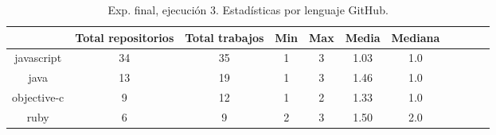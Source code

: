 \begin{table}
  \centering
  \caption{Exp. final, ejecución 3. Estadísticas por lenguaje GitHub.}
  \label{tab:tabla_f3_4}

\begin{footnotesize}
\renewcommand{\arraystretch}{1.5} %
\begin{tabular}{ccccccccccc}
  \hline
  {} &  Total repositorios &  Total trabajos &  Min &  Max &  Media &  Mediana \\
  \hline
  javascript   &         34 &          35 &    1 &    3 &   1.03 &      1.0 \\
  java         &         13 &          19 &    1 &    3 &   1.46 &      1.0 \\
  objective-c  &          9 &          12 &    1 &    2 &   1.33 &      1.0 \\
  ruby         &          6 &           9 &    2 &    3 &   1.50 &      2.0 \\
 \end{tabular}
\end{footnotesize}

\end{table}


